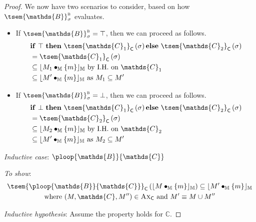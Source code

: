{\begin{proof}
We now have two scenarios to consider, based on how $\tsem{\mathds{B}}_\sigma^\textsc{b}$ evaluates.
\begin{itemize}
	\item If $\tsem{\mathds{B}}_\sigma^\textsc{b} = \top$, then we can proceed as follows.
		\begin{align*}			
			& \mathbf{if}\ \top\ \mathbf{then}\ \tsem{\mathds{C}_1}_\mathsf{C}\left( \sigma \right) \mathbf{else}\ \tsem{\mathds{C}_2}_\mathsf{C}\left( \sigma \right) \\
				&=
			\tsem{\mathds{C}_1}_\mathsf{C} \left( \sigma \right) \\
				&
			\subseteq \lfloor M_1 \bullet_\mathbb{M} \{m\} \rfloor_\mathbb{M} \text{ by I.H. on } \mathds{C}_1 \\
				&
			\subseteq \lfloor M' \bullet_\mathbb{M} \{m\} \rfloor_\mathbb{M} \text{ as } M_1 \subseteq M'
		\end{align*}
	\item If $\tsem{\mathds{B}}_\sigma^\textsc{b} = \bot$, then we can proceed as follows.
		\begin{align*}			
			& \mathbf{if}\ \bot\ \mathbf{then}\ \tsem{\mathds{C}_1}_\mathsf{C}\left( \sigma \right) \mathbf{else}\ \tsem{\mathds{C}_2}_\mathsf{C}\left( \sigma \right) \\
			&=
			\tsem{\mathds{C}_2}_\mathsf{C} \left( \sigma \right) \\
			&
			\subseteq \lfloor M_2 \bullet_\mathbb{M} \{m\} \rfloor_\mathbb{M} \text{ by I.H. on } \mathds{C}_2 \\
			&
			\subseteq \lfloor M' \bullet_\mathbb{M} \{m\} \rfloor_\mathbb{M} \text{ as } M_2 \subseteq M'
		\end{align*}
\end{itemize}

\textit{Inductive case}: $\ploop{\mathds{B}}{\mathds{C}}$

\textit{To show}:
\begin{gather*}
	\tsem{\ploop{\mathds{B}}{\mathds{C}}}_\mathsf{C} \left( \lfloor M \bullet_\mathbb{M} \{m\} \rfloor_\mathbb{M} \right) \subseteq \lfloor M' \bullet_\mathbb{M} \{m\} \rfloor_\mathbb{M}
	\\
	\text{where } (M, \mathds{C}, M'') \in \textsc{Ax}_\mathsf{C} \text{ and } M' \equiv M \cup M''
\end{gather*}

\textit{Inductive hypothesis}: Assume the property holds for $\mathds{C}$.


\end{proof}}
